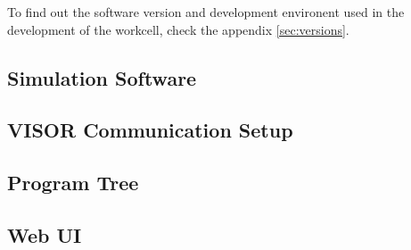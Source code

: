 To find out the software version and development environent used in the development of the workcell, check the appendix \ref{sec:versions}.


\subsection{Simulation Software}
\label{subsec:simulation-software}



\subsection{VISOR Communication Setup}
\label{subsec:computer-vision}


\subsection{Program Tree}
\label{subsec:program-tree}


\subsection{Web UI}
\label{subsec:web-ui}
